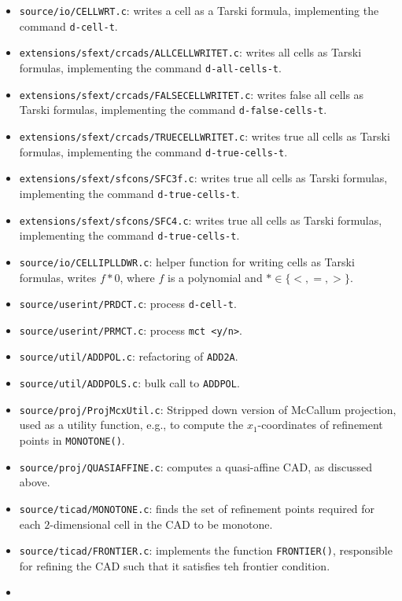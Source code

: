 \documentclass[
]{book}
\theoremstyle{definition}
\theoremstyle{definition}
\theoremstyle{definition}
\theoremstyle{definition}
\theoremstyle{remark}
\begin{document}
\begin{itemize}
\item
  \texttt{source/io/CELLWRT.c}: writes a cell as a Tarski formula, implementing the command \texttt{d-cell-t}.
\item
  \texttt{extensions/sfext/crcads/ALLCELLWRITET.c}: writes all cells as Tarski formulas, implementing the command \texttt{d-all-cells-t}.
\item
  \texttt{extensions/sfext/crcads/FALSECELLWRITET.c}: writes false all cells as Tarski formulas, implementing the command \texttt{d-false-cells-t}.
\item
  \texttt{extensions/sfext/crcads/TRUECELLWRITET.c}: writes true all cells as Tarski formulas, implementing the command \texttt{d-true-cells-t}.
\item
  \texttt{extensions/sfext/sfcons/SFC3f.c}: writes true all cells as Tarski formulas, implementing the command \texttt{d-true-cells-t}.
\item
  \texttt{extensions/sfext/sfcons/SFC4.c}: writes true all cells as Tarski formulas, implementing the command \texttt{d-true-cells-t}.
\item
  \texttt{source/io/CELLIPLLDWR.c}: helper function for writing cells as Tarski formulas, writes \(f * 0\), where \(f\) is a polynomial and \(* \in \{ <, =, > \}\).
\item
  \texttt{source/userint/PRDCT.c}: process \texttt{d-cell-t}.
\item
  \texttt{source/userint/PRMCT.c}: process \texttt{mct\ \textless{}y/n\textgreater{}}.
\item
  \texttt{source/util/ADDPOL.c}: refactoring of \texttt{ADD2A}.
\item
  \texttt{source/util/ADDPOLS.c}: bulk call to \texttt{ADDPOL}.
\item
  \texttt{source/proj/ProjMcxUtil.c}: Stripped down version of McCallum projection, used as a utility function, e.g., to compute the \(x_1\)-coordinates of refinement points in \texttt{MONOTONE()}.
\item
  \texttt{source/proj/QUASIAFFINE.c}: computes a quasi-affine CAD, as discussed above.
\item
  \texttt{source/ticad/MONOTONE.c}: finds the set of refinement points required for each \(2\)-dimensional cell in the CAD to be monotone.
\item
  \texttt{source/ticad/FRONTIER.c}: implements the function \texttt{FRONTIER()}, responsible for refining the CAD such that it satisfies teh frontier condition.
\item

\end{itemize}
\end{document}
